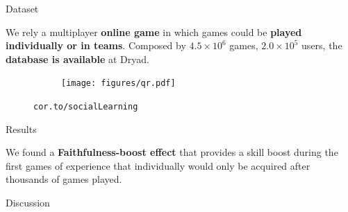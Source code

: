 \documentclass[a0]{a0poster}
\begin{document}
\vspace{3cm}

\begin{paracol}{3}

 \columnseprule=0pt
 
 \begin{justify}
{\fontsize{55}{0}\selectfont Dataset}
\vspace{1cm}
 \fontsize{43}{50}\selectfont

   We rely a multiplayer \textbf{online game} in which games could be \textbf{played individually or in teams}. Composed by $4.5\times 10^6$ games, $2.0\times 10^5$ users, the \textbf{database is available} at Dryad.  \par

\end{justify}

\vspace{2cm}
\begin{figure}[H]     
     \centering \normalsize 
     \begin{subfigure}[c]{0.07\textwidth}
     \hspace{0.33cm}
        \texttt{[image: figures/qr.pdf]}
     \end{subfigure}     
        {\fontsize{75}{0}\selectfont \texttt{cor.to/socialLearning} }
\end{figure}


 \switchcolumn
 \begin{justify}
{\fontsize{55}{0}\selectfont Results}
\vspace{1cm}
 \fontsize{43}{50}\selectfont

 We found a \textbf{Faithfulness-boost effect} that provides a skill boost during the first games of experience that individually would only be acquired after thousands of games played.
 
 

 \end{justify}

 
\vspace{3.5cm}

 \begin{justify}
{\fontsize{55}{0}\selectfont Discussion}
\vspace{1cm}
 \fontsize{43}{50}\selectfont


\end{justify}
\end{paracol}
\end{document}
